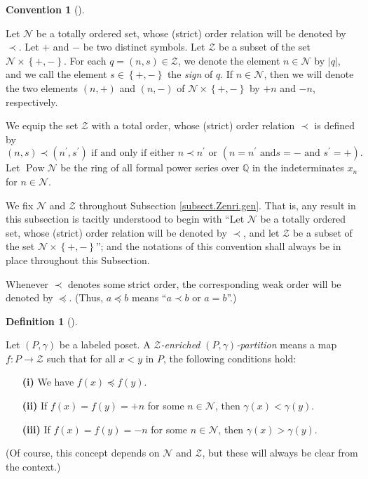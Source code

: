 \documentclass[numbers=enddot,12pt,final,onecolumn,notitlepage]{scrartcl}%
\theoremstyle{definition}
\newtheorem{defi}[theo]{Definition}
\newenvironment{definition}[1][]
{\begin{defi}[#1]\begin{leftbar}}
{\end{leftbar}\end{defi}}
\newtheorem{conv}[theo]{Convention}
\newenvironment{convention}[1][]
{\begin{conv}[#1]\begin{leftbar}}
{\end{leftbar}\end{conv}}
\newenvironment{convention}[1][Convention]{\noindent\textbf{#1.} }{\ \rule{0.5em}{0.5em}}
\begin{document}
\begin{convention}
Let $\mathcal{N}$ be a totally ordered set, whose (strict) order relation will
be denoted by $\prec$. Let $+$ and $-$ be two distinct symbols. Let
$\mathcal{Z}$ be a subset of the set $\mathcal{N}\times\left\{  +,-\right\}
$. For each $q=\left(  n,s\right)  \in\mathcal{Z}$, we denote the element
$n\in\mathcal{N}$ by $\left\vert q\right\vert $, and we call the element
$s\in\left\{  +,-\right\}  $ the \textit{sign} of $q$. If $n\in\mathcal{N}$,
then we will denote the two elements $\left(  n,+\right)  $ and $\left(
n,-\right)  $ of $\mathcal{N}\times\left\{  +,-\right\}  $ by $+n$ and $-n$, respectively.

We equip the set $\mathcal{Z}$ with a total order, whose (strict) order
relation $\prec$ is defined by%
\[
\left(  n,s\right)  \prec\left(  n^{\prime},s^{\prime}\right)  \text{ if and
only if either }n\prec n^{\prime}\text{ or }\left(  n=n^{\prime}\text{ and
}s=-\text{ and }s^{\prime}=+\right)  .
\]
Let $\operatorname*{Pow}\mathcal{N}$ be the ring of all formal power series
over $\mathbb{Q}$ in the indeterminates $x_{n}$ for $n\in\mathcal{N}$.

We fix $\mathcal{N}$ and $\mathcal{Z}$ throughout Subsection
\ref{subsect.Zenri.gen}. That is, any result in this subsection is tacitly
understood to begin with \textquotedblleft Let $\mathcal{N}$ be a totally
ordered set, whose (strict) order relation will be denoted by $\prec$, and let
$\mathcal{Z}$ be a subset of the set $\mathcal{N}\times\left\{  +,-\right\}
$\textquotedblright; and the notations of this convention shall always be
in place throughout this Subsection.

Whenever $\prec$ denotes some strict order, the corresponding weak order will
be denoted by $\preccurlyeq$. (Thus, $a \preccurlyeq b$ means ``$a \prec b$ or
$a = b$''.)
\end{convention}

\begin{definition}
\label{def.ambivPp}Let $\left(  P,\gamma\right)  $ be a labeled poset. A
\textit{$\mathcal{Z}$-enriched }$\left(  P,\gamma\right)  $\textit{-partition}
means a map $f:P\rightarrow\mathcal{Z}$ such that for all $x<y$ in $P$, the
following conditions hold:

\begin{enumerate}
\item[\textbf{(i)}] We have $f\left(  x\right)  \preccurlyeq f\left(
y\right)  $.

\item[\textbf{(ii)}] If $f\left(  x\right)  =f\left(  y\right)  =+n$ for some
$n\in\mathcal{N}$, then $\gamma\left(  x\right)  <\gamma\left(  y\right)  $.

\item[\textbf{(iii)}] If $f\left(  x\right)  =f\left(  y\right)  =-n$ for some
$n\in\mathcal{N}$, then $\gamma\left(  x\right)  >\gamma\left(  y\right)  $.
\end{enumerate}

(Of course, this concept depends on $\mathcal{N}$ and $\mathcal{Z}$, but these
will always be clear from the context.)
\end{definition}
\end{document}
